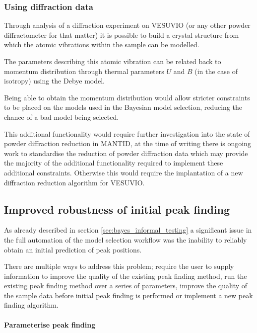 \documentclass[a4paper]{article}
\begin{document}
\subsubsection{Using diffraction data}

Through analysis of a diffraction experiment on VESUVIO (or any other powder
diffractometer for that matter) it is possible to build a crystal structure from
which the atomic vibrations within the sample can be modelled.

The parameters describing this atomic vibration can be related back to momentum
distribution through thermal parameters $U$ and $B$ (in the case of isotropy)
using the Debye \cite{Debye_1912} model.

Being able to obtain the momentum distribution would allow stricter constraints
to be placed on the models used in the Bayesian model selection, reducing the
chance of a bad model being selected.

This additional functionality would require further investigation into the state
of powder diffraction reduction in \gls*{MANTID}, at the time of writing there
is ongoing work to standardise the reduction of powder diffraction data which
may provide the majority of the additional functionality required to implement
these additional constraints. Otherwise this would require the implantation of a
new diffraction reduction algorithm for VESUVIO.

\subsection{Improved robustness of initial peak finding}

As already described in section \ref{sec:bayes_informal_testing} a significant
issue in the full automation of the model selection workflow was the inability
to reliably obtain an initial prediction of peak positions.

There are multiple ways to address this problem; require the user to supply
information to improve the quality of the existing peak finding method, run the
existing peak finding method over a series of parameters, improve the quality of
the sample data before initial peak finding is performed or implement a new peak
finding algorithm.

\paragraph{Parameterise peak finding} \hfill \\
\end{document}
